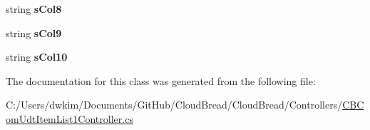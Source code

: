 \begin{DoxyCompactItemize}
\item 
string {\bfseries s\+Col8}\hypertarget{class_cloud_bread_1_1_controllers_1_1_c_b_com_udt_item_list1_controller_1_1_input_params_a81367fc2cfa35393431a666c0eff8929}{}\label{class_cloud_bread_1_1_controllers_1_1_c_b_com_udt_item_list1_controller_1_1_input_params_a81367fc2cfa35393431a666c0eff8929}

\item 
string {\bfseries s\+Col9}\hypertarget{class_cloud_bread_1_1_controllers_1_1_c_b_com_udt_item_list1_controller_1_1_input_params_aa5aaa83b201c704a476f95744d9e3cda}{}\label{class_cloud_bread_1_1_controllers_1_1_c_b_com_udt_item_list1_controller_1_1_input_params_aa5aaa83b201c704a476f95744d9e3cda}

\item 
string {\bfseries s\+Col10}\hypertarget{class_cloud_bread_1_1_controllers_1_1_c_b_com_udt_item_list1_controller_1_1_input_params_aae0c9304e695b4a77f16e29cfc938568}{}\label{class_cloud_bread_1_1_controllers_1_1_c_b_com_udt_item_list1_controller_1_1_input_params_aae0c9304e695b4a77f16e29cfc938568}

\end{DoxyCompactItemize}


The documentation for this class was generated from the following file\+:\begin{DoxyCompactItemize}
\item 
C\+:/\+Users/dwkim/\+Documents/\+Git\+Hub/\+Cloud\+Bread/\+Cloud\+Bread/\+Controllers/\hyperlink{_c_b_com_udt_item_list1_controller_8cs}{C\+B\+Com\+Udt\+Item\+List1\+Controller.\+cs}\end{DoxyCompactItemize}
